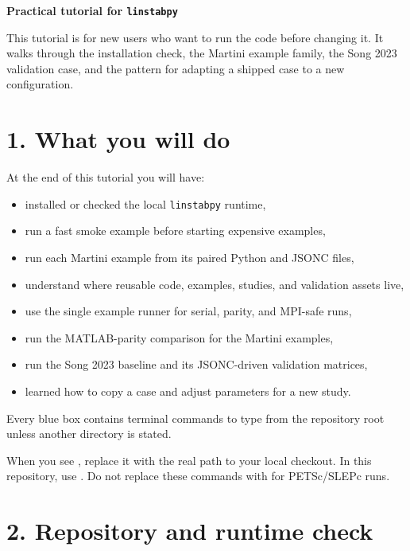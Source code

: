 \documentclass[11pt,a4paper]{article}
\newcommand{\code}[1]{\texttt{\detokenize{#1}}}
\begin{document}
{\Large\bfseries Practical tutorial for \texttt{linstabpy}\par}
\vspace{0.35em}

This tutorial is for new users who want to run the code before changing it. It walks through the installation check, the Martini example family, the Song 2023 validation case, and the pattern for adapting a shipped case to a new configuration.

\section*{1. What you will do}

At the end of this tutorial you will have:

\begin{itemize}[leftmargin=2em]
  \item installed or checked the local \texttt{linstabpy} runtime,
  \item run a fast smoke example before starting expensive examples,
  \item run each Martini example from its paired Python and JSONC files,
  \item understand where reusable code, examples, studies, and validation assets live,
  \item use the single example runner for serial, parity, and MPI-safe runs,
  \item run the MATLAB-parity comparison for the Martini examples,
  \item run the Song 2023 baseline and its JSONC-driven validation matrices,
  \item learned how to copy a case and adjust parameters for a new study.
\end{itemize}

\begin{notebox}
Every blue box contains terminal commands to type from the repository root unless another directory is stated.
\end{notebox}

\begin{warningbox}
When you see , replace it with the real path to your local checkout. In this repository, use \code{.venv/bin/python}. Do not replace these commands with \code{uv run} for PETSc/SLEPc runs.
\end{warningbox}

\section*{2. Repository and runtime check}
\end{document}
